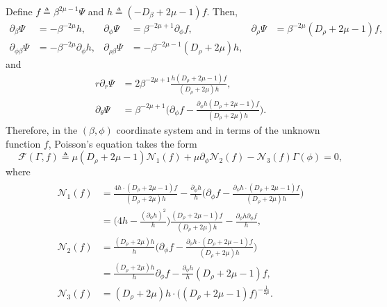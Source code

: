 \documentclass[11pt]{article}
\theoremstyle{definition}
\theoremstyle{remark}
\numberwithin{equation}{section}
\newcommand{\mcal}{\mathcal}
\newcommand{\del}{\partial}
\begin{document}
Define $f \triangleq \beta^{2\mu-1} \Psi$ and $h \triangleq (-D_\beta + 2\mu - 1)f$. Then,
\begin{align*}
  \del_\beta \Psi &= -\beta^{-2\mu} h, & \del_\phi \Psi &= \beta^{-2\mu + 1} \del_\phi f, & \del_\rho \Psi &= \beta^{-2\mu} (D_\rho + 2\mu - 1)f,\\
  \del_{\phi\beta} \Psi &= -\beta^{-2\mu} \del_\phi h, & \del_{\rho\beta} \Psi &= -\beta^{-2\mu-1} (D_\rho + 2\mu) h, & &
\end{align*}
and
\begin{align*}
  r\del_r \Psi &= 2 \beta^{-2\mu + 1} \frac{h (D_\rho + 2\mu - 1)f}{(D_\rho + 2\mu)h},\\
  \del_\theta \Psi &= \beta^{-2\mu + 1} \bigg(\del_\phi f - \frac{\del_\phi h (D_\rho + 2\mu - 1)f}{(D_\rho + 2\mu)h} \bigg).
\end{align*}
Therefore, in the $(\beta, \phi)$ coordinate system and in terms of the unknown function $f$, Poisson’s equation takes the form
\begin{equation} \label{eq:2.9}
\mcal{F}(\Gamma, f) \triangleq \mu (D_\rho + 2\mu - 1) \mcal{N}_1(f) + \mu\del_\phi \mcal{N}_2 (f) - \mcal{N}_3(f) \Gamma(\phi) = 0,
\end{equation}
where
\begin{align} \label{eq:2.10} \begin{split}
  \mcal{N}_1(f) &= \frac{4h \cdot (D_\rho + 2\mu - 1)f}{(D_\rho + 2\mu)h} - \frac{\del_\phi h}{h} \bigg( \del_\phi f - \frac{\del_\phi h \cdot (D_\rho + 2\mu - 1)f}{(D_\rho + 2\mu)h} \bigg) \\
  &= \bigg( 4h - \frac{(\del_\phi h)^2}{h} \bigg) \frac{(D_\rho + 2\mu - 1)f}{(D_\rho + 2\mu)h} - \frac{\del_\phi h \del_\phi f}{h} ,\\
  \mcal{N}_2(f) &= \frac{(D_\rho + 2\mu)h}{h} \bigg( \del_\phi f - \frac{\del_\phi h \cdot (D_\rho + 2\mu - 1)f}{(D_\rho + 2\mu)h} \bigg)\\
  &= \frac{(D_\rho + 2\mu)h}{h} \del_\phi f - \frac{\del_\phi h}{h} (D_\rho + 2\mu - 1)f,\\
  \mcal{N}_3(f) &= (D_\rho + 2\mu) h \cdot \big( (D_\rho + 2\mu - 1)f \big)^{-\frac{1}{2\mu}}.
\end{split} \end{align}
\end{document}
